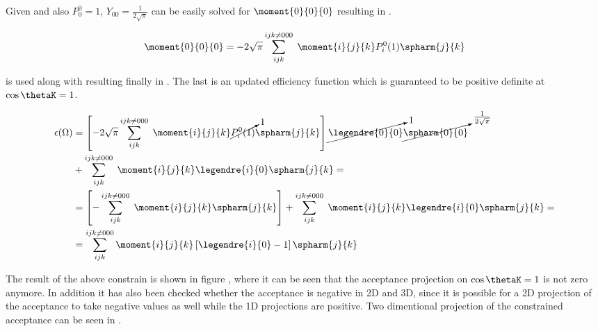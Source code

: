 \noindent Given  and also $P_{0}^{0}=1$,  $Y_{00} = \frac{1}{2\sqrt{\pi}}$  can be
easily solved for $\moment{0}{0}{0}$ resulting in .

\begin{center}
\begin{equation}
  \moment{0}{0}{0} = -2\sqrt{\pi} \sum_{ijk}^{ijk\neq 000} \; \moment{i}{j}{k} P_i^0(1) \spharm{j}{k}
  \label{eff_constr_mom}
\end{equation}
\end{center}

\noindent {} is used along with  resulting finally in .
The last is an updated efficiency function which is guaranteed to be positive definite at $\cos\thetaK=1$.

\begin{center}
\begin{align}
  \epsilon(\Omega) &= \left[-2\sqrt{\pi} \sum_{ijk}^{ijk\neq 000} \; \moment{i}{j}{k} \cancelto{1}{P_i^0(1)} \spharm{j}{k} \right] \cancelto{1}{\legendre{0}{0}} \cancelto{\frac{1}{2\sqrt{\pi}}}{\spharm{0}{0}} \nonumber \\
                   &+ \sum_{ijk}^{ijk\neq 000} \; \moment{i}{j}{k} \legendre{i}{0} \spharm{j}{k} = \nonumber \\
                   &= \left[- \sum_{ijk}^{ijk\neq 000} \; \moment{i}{j}{k} \spharm{j}{k} \right] + \sum_{ijk}^{ijk\neq 000} \; \moment{i}{j}{k} \legendre{i}{0} \spharm{j}{k} = \nonumber\\
                   &= \sum_{ijk}^{ijk\neq 000} \moment{i}{j}{k} \left[ \legendre{i}{0} - 1 \right]\spharm{j}{k}
  \label{eff_func_final}
\end{align}
\end{center}

\noindent The result of the above constrain is shown in figure , where it can be seen that the acceptance projection on $\cos\thetaK=1$
is not zero anymore. In addition it has also been checked whether the acceptance is negative in 2D and 3D, since it is possible for a 2D
projection of the acceptance to take negative values as well while the 1D projections are positive. Two dimentional projection of the constrained acceptance
can be seen in .

